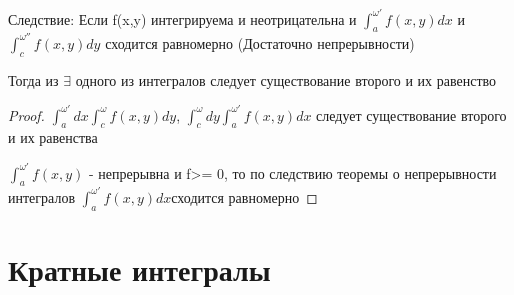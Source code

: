 \documentclass[a4paper]{article}
\theoremstyle{definition}
\theoremstyle{remark}
\begin{document}
Следствие: Если f(x,y) интегрируема и неотрицательна и $\int_a^{\omega'}f(x,y)dx$ и $\int_c^{\omega''}f(x,y)dy$ сходится равномерно (Достаточно непрерывности)

Тогда из $\exists$ одного из интегралов следует существование второго и их равенство

\begin{proof}
     $\int_a^{\omega'} dx \int_c^{\omega}f(x,y)dy$, $\int_c^{\omega}dy \int_a^{\omega'}f(x,y) dx $ следует существование второго и их равенства

$\int_a^{\omega'}f(x,y)$ - непрерывна и f>= 0, \hypertarget{[p5]}{то по следствию теоремы о непрерывности интегралов } $\int_a^{\omega'}f(x,y)dx$сходится равномерно
\end{proof}
    \section{Кратные интегралы}
\end{document}
